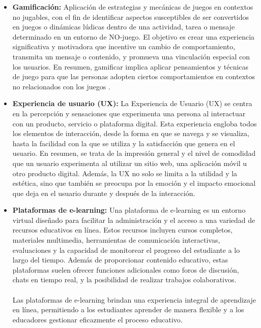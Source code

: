 \begin{itemize}
\item \textbf{Gamificación:} Aplicación de estrategias y mecánicas de juegos en contextos no jugables, con el fin de identificar aspectos susceptibles de ser convertidos en juegos o dinámicas lúdicas dentro de una actividad, tarea o mensaje determinado en un entorno de NO-juego. El objetivo es crear una experiencia significativa y motivadora que incentive un cambio de comportamiento, transmita un mensaje o contenido, y promueva una vinculación especial con los usuarios. En resumen, gamificar implica aplicar pensamientos y técnicas de juego para que las personas adopten ciertos comportamientos en contextos no relacionados con los juegos \cite{jenui2014}.

\item \textbf{Experiencia de usuario (UX):} La Experiencia de Usuario (UX) se centra en la percepción y sensaciones que experimenta una persona al interactuar con un producto, servicio o plataforma digital. Esta experiencia engloba todos los elementos de interacción, desde la forma en que se navega y se visualiza, hasta la facilidad con la que se utiliza y la satisfacción que genera en el usuario. En resumen, se trata de la impresión general y el nivel de comodidad que un usuario experimenta al utilizar un sitio web, una aplicación móvil u otro producto digital. Además, la UX no solo se limita a la utilidad y la estética, sino que también se preocupa por la emoción y el impacto emocional que deja en el usuario durante y después de la interacción.

\item \textbf{Plataformas de e-learning:} Una plataforma de e-learning es un entorno virtual diseñado para facilitar la administración y el acceso a una variedad de recursos educativos en línea. Estos recursos incluyen cursos completos, materiales multimedia, herramientas de comunicación interactivas, evaluaciones y la capacidad de monitorear el progreso del estudiante a lo largo del tiempo. Además de proporcionar contenido educativo, estas plataformas suelen ofrecer funciones adicionales como foros de discusión, chats en tiempo real, y la posibilidad de realizar trabajos colaborativos. 
\\
\\
Las plataformas de e-learning brindan una experiencia integral de aprendizaje en línea, permitiendo a los estudiantes aprender de manera flexible y a los educadores gestionar eficazmente el proceso educativo.


\end{itemize}
